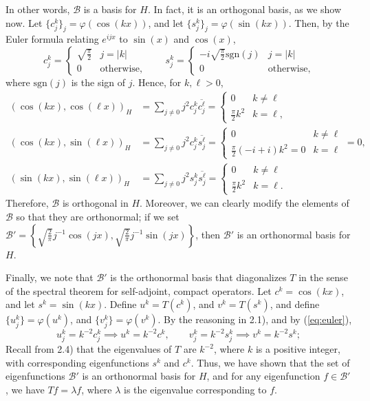 \documentclass{homework}
\begin{document}
\begin{arabicparts}
		In other words, $\mathcal{B}$ is a basis for $H$. In fact, it is an orthogonal basis, as we show now. Let $\{c^k_j\}_j = \varphi(\cos(kx))$, and let $\{s^k_j\}_j = \varphi(\sin(kx))$. Then, by the Euler formula relating $e^{ijx}$ to $\sin(x)$ and $\cos(x)$,
		\begin{equation}
			\label{eq:euler}
			c^k_j = \begin{cases}
				\sqrt{\frac{\pi}{2}} & j = |k| \\
				0 & \text{otherwise},
			\end{cases}\qquad
			s^k_j = \begin{cases}
				-i\sqrt{\frac{\pi}{2}}\mathrm{sgn}(j) & j = |k| \\
				0 & \text{otherwise},
			\end{cases}
		\end{equation}
		where $\mathrm{sgn}(j)$ is the sign of $j$. Hence, for $k, \ell > 0$,
		\begin{align}
			(\cos(kx), \cos(\ell x))_H &= \sum_{j\ne0}j^2c^k_j\overline{c^\ell_j} = \begin{cases}
				0 & k \ne \ell \\
				\frac{\pi}{2}k^2 & k = \ell,
			\end{cases}\\
			(\cos(kx), \sin(\ell x))_H &= \sum_{j\ne0}j^2c^k_j\overline{s^\ell_j} = \begin{cases}
				0 & k\ne \ell \\
				\frac{\pi}{2}\left(-i + i\right)k^2 = 0 & k = \ell
			\end{cases} = 0,\\
			(\sin(kx), \sin(\ell x))_H &= \sum_{j\ne0}j^2s^k_j\overline{s^\ell_j} = \begin{cases}
				0 & k\ne \ell \\
				\frac{\pi}{2}k^2 & k = \ell.
			\end{cases}
		\end{align}
		Therefore, $\mathcal{B}$ is orthogonal in $H$. Moreover, we can clearly modify the elements of $\mathcal{B}$ so that they are orthonormal; if we set $\mathcal{B}' = \left\{\sqrt{\frac{2}{\pi}}j^{-1}\cos(jx), \sqrt{\frac{2}{\pi}}j^{-1}\sin(jx)\right\}$, then $\mathcal{B}'$ is an orthonormal basis for $H$.
		
		Finally, we note that $\mathcal{B}'$ is the orthonormal basis that diagonalizes $T$ in the sense of the spectral theorem for self-adjoint, compact operators. Let $c^k = \cos(kx)$, and let $s^k = \sin(kx)$. Define $u^k = T(c^k)$, and $v^k = T(s^k)$, and define $\{u^k_j\} = \varphi(u^k)$, and $\{v^k_j\} = \varphi(v^k)$. By the reasoning in 2.1), and by (\ref{eq:euler}),
		\begin{equation}
			u^k_j = k^{-2}c^k_j \implies u^k = k^{-2}c^k, \qquad v^k_j = k^{-2}s^k_j \implies v^k = k^{-2}s^k;
		\end{equation}
		Recall from 2.4) that the eigenvalues of $T$ are $k^{-2}$, where $k$ is a positive integer, with corresponding eigenfunctions $s^k$ and $c^k$. Thus, we have shown that the set of eigenfunctions $\mathcal{B}'$ is an orthonormal basis for $H$, and for any eigenfunction $f \in \mathcal{B}'$, we have $Tf = \lambda f$, where $\lambda$ is the eigenvalue corresponding to $f$.
	\end{arabicparts}
\end{document}
